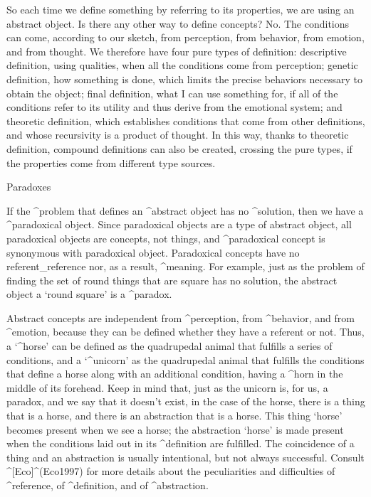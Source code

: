 So each time we define something by referring to its properties, we are
using an abstract object. Is there any other way to define concepts? No.
The conditions can come, according to our sketch, from perception, from
behavior, from emotion, and from thought. We therefore have four pure
types of definition: descriptive definition, using qualities, when all
the conditions come from perception; genetic definition, how something
is done, which limits the precise behaviors necessary to obtain the
object; final definition, what I can use something for, if all of the
conditions refer to its utility and thus derive from the emotional
system; and theoretic definition, which establishes conditions that come
from other definitions, and whose recursivity is a product of thought.
In this way, thanks to theoretic definition, compound definitions can
also be created, crossing the pure types, if the properties come from
different type sources.


\Section Paradoxes

If the ^{problem} that defines an ^{abstract object} has no ^{solution},
then we have a ^{paradoxical object}. Since paradoxical objects are a
type of abstract object, all paradoxical objects are concepts, not
things, and ^{paradoxical concept} is synonymous with paradoxical
object. Paradoxical concepts have no referent_{reference} nor, as a
result, ^{meaning}. For example, just as the problem of finding the set
of round things that are square has no solution, the abstract object a
`round square' is a ^{paradox}.

Abstract concepts are independent from ^{perception}, from ^{behavior},
and from ^{emotion}, because they can be defined whether they have a
referent or not. Thus, a `^{horse}' can be defined as the quadrupedal
animal that fulfills a series of conditions, and a `^{unicorn}' as the
quadrupedal animal that fulfills the conditions that define a horse
along with an additional condition, having a ^{horn} in the middle of
its forehead. Keep in mind that, just as the unicorn is, for us, a
paradox, and we say that it doesn't exist, in the case of the horse,
there is a thing that is a horse, and there is an abstraction that is a
horse. This thing `horse' becomes present when we see a horse; the
abstraction `horse' is made present when the conditions laid out in its
^{definition} are fulfilled. The coincidence of a thing and an
abstraction is usually intentional, but not always successful. Consult
^[Eco]^(Eco1997) for more details about the peculiarities and
difficulties of ^{reference}, of ^{definition}, and of ^{abstraction}.

